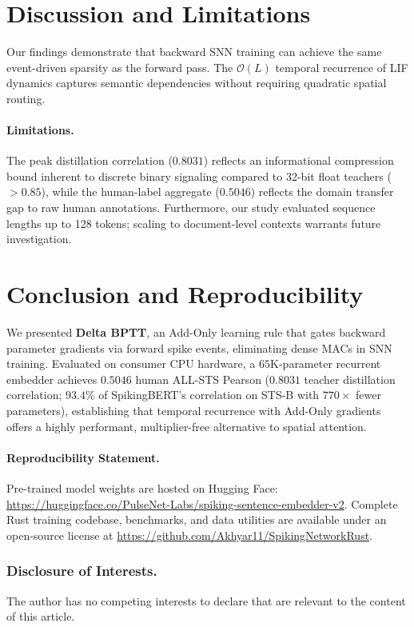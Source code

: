 \documentclass[runningheads]{llncs}
\begin{document}
\section{Discussion and Limitations}
Our findings demonstrate that backward SNN training can achieve the same event-driven sparsity as the forward pass. The $\mathcal{O}(L)$ temporal recurrence of LIF dynamics captures semantic dependencies without requiring quadratic spatial routing. 

\paragraph{Limitations.} The peak distillation correlation ($0.8031$) reflects an informational compression bound inherent to discrete binary signaling compared to 32-bit float teachers ($>0.85$), while the human-label aggregate ($0.5046$) reflects the domain transfer gap to raw human annotations. Furthermore, our study evaluated sequence lengths up to 128 tokens; scaling to document-level contexts warrants future investigation.

\section{Conclusion and Reproducibility}
We presented \textbf{Delta BPTT}, an Add-Only learning rule that gates backward parameter gradients via forward spike events, eliminating dense MACs in SNN training. Evaluated on consumer CPU hardware, a $65$K-parameter recurrent embedder achieves $0.5046$ human ALL-STS Pearson ($0.8031$ teacher distillation correlation; $93.4\%$ of SpikingBERT's correlation on STS-B with $770\times$ fewer parameters), establishing that temporal recurrence with Add-Only gradients offers a highly performant, multiplier-free alternative to spatial attention.

\paragraph{Reproducibility Statement.} Pre-trained model weights are hosted on Hugging Face: \url{https://huggingface.co/PulseNet-Labs/spiking-sentence-embedder-v2}. Complete Rust training codebase, benchmarks, and data utilities are available under an open-source license at \url{https://github.com/Akhyar11/SpikingNetworkRust}.

\subsubsection*{Disclosure of Interests.}
{\small The author has no competing interests to declare that are relevant to the content of this article.}
\end{document}
